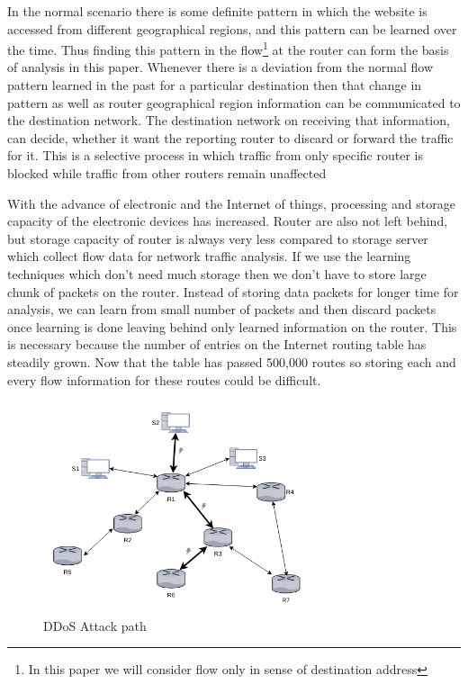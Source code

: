 \documentclass[12pt,oneside,a4paper]{article}
\begin{document}
In the normal scenario there is some definite pattern in which the website is accessed from different geographical regions, and this pattern can be learned over the time. Thus finding this pattern in the flow\footnote{In this paper we will consider flow only in sense of destination address} at the router can form the basis of analysis in this paper. Whenever there is a deviation from the normal flow pattern learned in the past for a particular destination then that change in pattern as well as router geographical region information can be communicated to the destination network. The destination network on receiving that information, can decide, whether it want the reporting router to discard or forward the traffic for it. This is a selective process in which traffic from only specific router is blocked while traffic from other routers remain unaffected\par

With the advance of electronic and the Internet of things, processing and storage capacity of the electronic devices has increased. Router are also not left behind, but storage capacity of router is always very less compared to storage server which collect flow data for network traffic analysis. If we use the learning techniques which don't need much storage then we don't have to store large chunk of packets on the router. Instead of storing data packets for longer time for analysis, we can learn from small number of packets and then discard packets once learning is done leaving behind only learned information on the router. This is necessary because the number of entries on the Internet routing table has steadily grown. Now that the table has passed 500,000 routes\cite{routing-tablesize} so storing each and every flow information for these routes could be difficult.\par

\begin{figure}[H]
\centering
\includegraphics[width=0.70\textwidth]{RouterCommunication.png}
\caption{DDoS Attack path} \label{fig:attackpath}
\end{figure}
\end{document}
